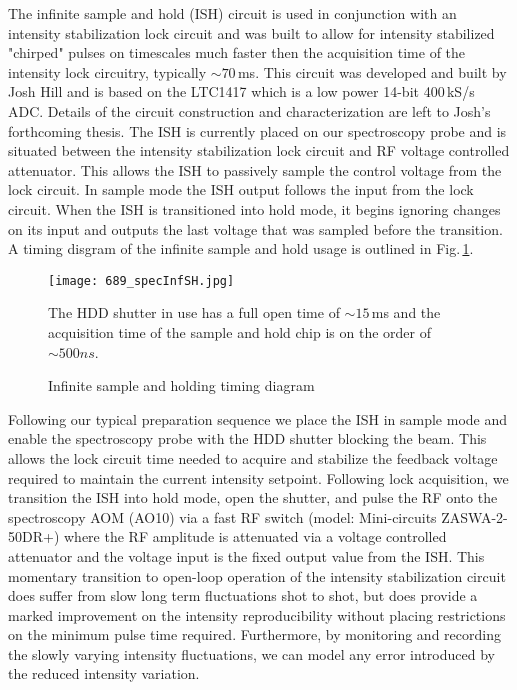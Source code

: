 The infinite sample and hold (ISH) circuit is used in conjunction with an intensity stabilization lock circuit and was built to allow for intensity stabilized "chirped" pulses on timescales much faster then the acquisition time of the intensity lock circuitry, typically $\sim70$\,ms.
This circuit was developed and built by Josh Hill and is based on the LTC1417 which is a low power 14-bit 400\,kS/s ADC.
Details of the circuit construction and characterization are left to Josh's forthcoming thesis.
The ISH is currently placed on our spectroscopy probe and is situated between the intensity stabilization lock circuit and RF voltage controlled attenuator.
This allows the ISH to passively sample the control voltage from the lock circuit.
In sample mode the ISH output follows the input from the lock circuit.
When the ISH is transitioned into hold mode, it begins ignoring changes on its input and outputs the last voltage that was sampled before the transition.
A timing disgram of the infinite sample and hold usage is outlined in Fig.\,\ref{fig:689specInfSH}.
	\begin{figure}
	\centerline{
		\texttt{[image: 689\_specInfSH.jpg]}}
		\caption{Infinite sample and holding timing diagram}{The HDD shutter in use has a full open time of $\sim15$\,ms and the acquisition time of the sample and hold chip is on the order of $\sim500ns$.}
		 \label{fig:689specInfSH}
	\end{figure}
Following our typical preparation sequence we place the ISH in sample mode and enable the spectroscopy probe with the HDD shutter blocking the beam. 
This allows the lock circuit time needed to acquire and stabilize the feedback voltage required to maintain the current intensity setpoint.
Following lock acquisition, we transition the ISH into hold mode, open the shutter, and pulse the RF onto the spectroscopy AOM (AO10) via a fast RF switch (model: Mini-circuits ZASWA-2-50DR+) where the RF amplitude is attenuated via a voltage controlled attenuator and the voltage input is the fixed output value from the ISH.
This momentary transition to open-loop operation of the intensity stabilization circuit does suffer from slow long term fluctuations shot to shot, but does provide a marked improvement on the intensity reproducibility without placing restrictions on the minimum pulse time required.
Furthermore, by monitoring and recording the slowly varying intensity fluctuations, we can model any error introduced by the reduced intensity variation.

